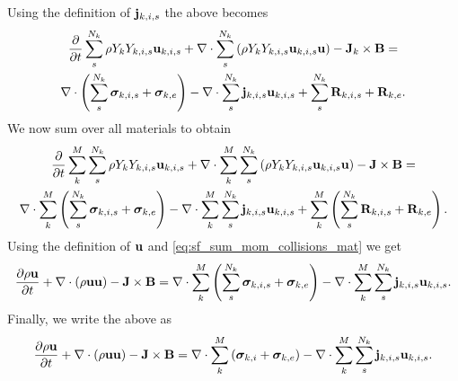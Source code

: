 \documentclass[a4paper,11pt]{report}
\begin{document}
Using the definition of $\mathbf{j}_{k,i,s}$ the above becomes
\begin{multline*}
    \frac{\partial}{\partial t} \sum_s^{N_k} \rho Y_k Y_{k,i,s} \mathbf{u}_{k,i,s} + \nabla \cdot \sum_s^{N_k} \left( \rho Y_k Y_{k,i,s} \mathbf{u}_{k,i,s} \mathbf{u}  \right) - \mathbf{J}_k \times \mathbf{B} = \\
    \nabla \cdot \left( \sum_s^{N_k} \bm \sigma_{k,i,s} + \bm \sigma_{k,e} \right) - \nabla \cdot \sum_s^{N_k} \mathbf{j}_{k,i,s} \mathbf{u}_{k,i,s} + \sum_s^{N_k} \mathbf{R}_{k,i,s} + \mathbf{R}_{k,e}.
\end{multline*}
We now sum over all materials to obtain
\begin{multline*}
    \frac{\partial}{\partial t} \sum_k^M \sum_s^{N_k} \rho Y_k Y_{k,i,s} \mathbf{u}_{k,i,s} + \nabla \cdot \sum_k^M \sum_s^{N_k} \left( \rho Y_k Y_{k,i,s} \mathbf{u}_{k,i,s} \mathbf{u}  \right) - \mathbf{J} \times \mathbf{B} = \\
    \nabla \cdot \sum_k^M \left( \sum_s^{N_k} \bm \sigma_{k,i,s} + \bm \sigma_{k,e} \right) - \nabla \cdot \sum_k^M \sum_s^{N_k} \mathbf{j}_{k,i,s} \mathbf{u}_{k,i,s} + \sum_k^M \left( \sum_s^{N_k} \mathbf{R}_{k,i,s} + \mathbf{R}_{k,e} \right).
\end{multline*}
Using the definition of $\mathbf{u}$ and \cref{eq:sf_sum_mom_collisions_mat} we get
\begin{equation*}
    \frac{\partial \rho \mathbf{u}}{\partial t} + \nabla \cdot \left( \rho \mathbf{u} \mathbf{u} \right) - \mathbf{J} \times \mathbf{B} = \nabla \cdot \sum_k^M \left( \sum_s^{N_k} \bm \sigma_{k,i,s} + \bm \sigma_{k,e} \right) - \nabla \cdot \sum_k^M \sum_s^{N_k} \mathbf{j}_{k,i,s} \mathbf{u}_{k,i,s}.
\end{equation*}
Finally, we write the above as
\begin{equation*}
    \frac{\partial \rho \mathbf{u}}{\partial t} + \nabla \cdot \left( \rho \mathbf{u} \mathbf{u} \right) - \mathbf{J} \times \mathbf{B} = \nabla \cdot \sum_k^M \left( \bm \sigma_{k,i} + \bm \sigma_{k,e} \right) - \nabla \cdot \sum_k^M \sum_s^{N_k} \mathbf{j}_{k,i,s} \mathbf{u}_{k,i,s}.
\end{equation*}
\end{document}

